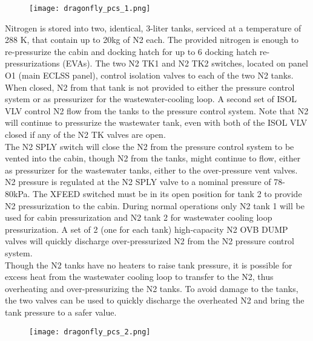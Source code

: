 \documentclass[Orbiter User Manual.tex]{subfiles}
\begin{document}
\begin{figure}[H]
  \centering
  \texttt{[image: dragonfly\_pcs\_1.png]}
\end{figure}

\noindent
Nitrogen is stored into two, identical, 3-liter tanks, serviced at a temperature of 288 K, that contain up to 20kg of N2 each. The provided nitrogen is enough to re-pressurize the cabin and docking hatch for up to 6 docking hatch re-pressurizations (EVAs). The two N2 TK1 and N2 TK2 switches, located on panel O1 (main ECLSS panel), control isolation valves to each of the two N2 tanks. When closed, N2 from that tank is not provided to either the pressure control system or as pressurizer for the wastewater-cooling loop. A second set of ISOL VLV control N2 flow from the tanks to the pressure control system. Note that N2 will continue to pressurize the wastewater tank, even with both of the ISOL VLV closed if any of the N2 TK valves are open.\\
The N2 SPLY switch will close the N2 from the pressure control system to be vented into the cabin, though N2 from the tanks, might continue to flow, either as pressurizer for the wastewater tanks, either to the over-pressure vent valves. N2 pressure is regulated at the N2 SPLY valve to a nominal pressure of 78-80kPa. The XFEED switched must be in its open position for tank 2 to provide N2 pressurization to the cabin. During normal operations only N2 tank 1 will be used for cabin pressurization and N2 tank 2 for wastewater cooling loop pressurization. A set of 2 (one for each tank) high-capacity N2 OVB DUMP valves will quickly discharge over-pressurized N2 from the N2 pressure control system.\\
Though the N2 tanks have no heaters to raise tank pressure, it is possible for excess heat from the wastewater cooling loop to transfer to the N2, thus overheating and over-pressurizing the N2 tanks. To avoid damage to the tanks, the two valves can be used to quickly discharge the overheated N2 and bring the tank pressure to a safer value.

\begin{figure}[H]
  \centering
  \texttt{[image: dragonfly\_pcs\_2.png]}
\end{figure}
\end{document}
